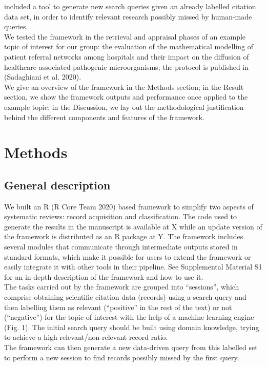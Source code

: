\documentclass{article}
\begin{document}
included a tool to generate new search queries given an already labelled
citation data set, in order to identify relevant research possibly
missed by human-made queries.\\
We tested the framework in the retrieval and appraisal phases of an
example topic of interest for our group: the evaluation of the
mathematical modelling of patient referral networks among hospitals and
their impact on the diffusion of healthcare-associated pathogenic
microorganisms; the protocol is published in (Sadaghiani et al. 2020).\\
We give an overview of the framework in the Methods section; in the
Result section, we show the framework outputs and performance once
applied to the example topic; in the Discussion, we lay out the
methodological justification behind the different components and
features of the framework.\\

\hypertarget{methods}{%
\section{Methods}\label{methods}}

\hypertarget{general-description}{%
\subsection{General description}\label{general-description}}

We built an R (R Core Team 2020) based framework to simplify two aspects
of systematic reviews: record acquisition and classification. The code
used to generate the results in the manuscript is available at X while
an update version of the framework is distributed as an R package at Y.
The framework includes several modules that communicate through
intermediate outputs stored in standard formats, which make it possible
for users to extend the framework or easily integrate it with other
tools in their pipeline. See Supplemental Material S1 for an in-depth
description of the framework and how to use it.\\
The tasks carried out by the framework are grouped into ``sessions'',
which comprise obtaining scientific citation data (records) using a
search query and then labelling them as relevant (``positive'' in the
rest of the text) or not (``negative'') for the topic of interest with
the help of a machine learning engine (Fig. 1). The initial search query
should be built using domain knowledge, trying to achieve a high
relevant/non-relevant record ratio.\\
The framework can then generate a new data-driven query from this
labelled set to perform a new session to find records possibly missed by
the first query.\\
\end{document}
